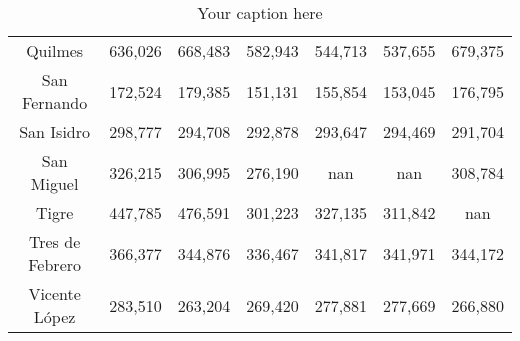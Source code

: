 \begin{table}[htb]
\begin{tabular}{|c|c|c|c|c|c|c|}
Quilmes & 636,026 & 668,483 & 582,943 & 544,713 & 537,655 & 679,375 \\
San Fernando & 172,524 & 179,385 & 151,131 & 155,854 & 153,045 & 176,795 \\
San Isidro & 298,777 & 294,708 & 292,878 & 293,647 & 294,469 & 291,704 \\
San Miguel & 326,215 & 306,995 & 276,190 & nan & nan & 308,784 \\
Tigre & 447,785 & 476,591 & 301,223 & 327,135 & 311,842 & nan \\
Tres de Febrero & 366,377 & 344,876 & 336,467 & 341,817 & 341,971 & 344,172 \\
Vicente López & 283,510 & 263,204 & 269,420 & 277,881 & 277,669 & 266,880 \\
\hline
\end{tabular}
\caption{Your caption here}
\label{tab:my_table}
\end{table}
